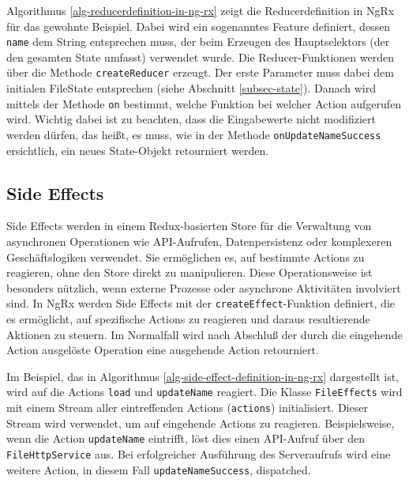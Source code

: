 \documentclass[12pt]{book}          %
\begin{document}
Algorithmus \ref{alg-reducerdefinition-in-ng-rx} zeigt die Reducerdefinition in NgRx für das gewohnte Beispiel. Dabei wird ein sogenanntes Feature definiert, dessen \texttt{name} dem String entsprechen muss, der beim Erzeugen des Hauptselektors (der den gesamten State umfasst) verwendet wurde. Die Reducer-Funktionen werden über die Methode \texttt{createReducer} erzeugt. Der erste Parameter muss dabei dem initialen FileState entsprechen (siehe Abschnitt \ref{subsec-state}). Danach wird mittels der Methode \texttt{on} bestimmt, welche Funktion bei welcher Action aufgerufen wird. Wichtig dabei ist zu beachten, dass die Eingabewerte nicht modifiziert werden dürfen, das heißt, es muss, wie in der Methode \texttt{onUpdateNameSuccess} ersichtlich, ein neues State-Objekt retourniert werden.


\subsection{Side Effects}
\label{subsec-side-effects}
Side Effects werden in einem Redux-basierten Store für die Verwaltung von asynchronen Operationen wie API-Aufrufen, Datenpersistenz oder komplexeren Geschäftslogiken verwendet. Sie ermöglichen es, auf bestimmte Actions zu reagieren, ohne den Store direkt zu manipulieren. Diese Operationsweise ist besonders nützlich, wenn externe Prozesse oder asynchrone Aktivitäten involviert sind. In NgRx werden Side Effects mit der \texttt{createEffect}-Funktion definiert, die es ermöglicht, auf spezifische Actions zu reagieren und daraus resultierende Aktionen zu steuern. Im Normalfall wird nach Abschluß der durch die eingehende Action ausgelöste Operation eine ausgehende Action retourniert.

Im Beispiel, das in Algorithmus \ref{alg-side-effect-definition-in-ng-rx} dargestellt ist, wird auf die Actions \texttt{load} und \texttt{updateName} reagiert. Die Klasse \texttt{FileEffects} wird mit einem Stream aller eintreffenden Actions (\texttt{actions}) initialisiert. Dieser Stream wird verwendet, um auf eingehende Actions zu reagieren. Beispielsweise, wenn die Action \texttt{updateName} eintrifft, löst dies einen API-Aufruf über den \texttt{FileHttpService} aus. Bei erfolgreicher Ausführung des Serveraufrufs wird eine weitere Action, in diesem Fall \texttt{updateNameSuccess}, dispatched.
\end{document}
